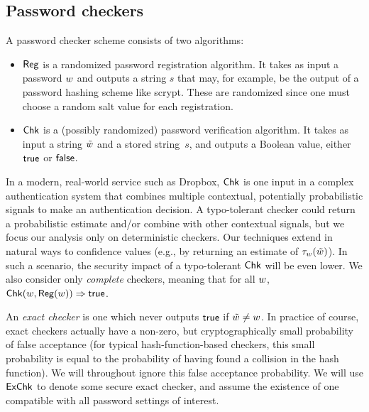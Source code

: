 \subsection{Password checkers}
A password checker scheme consists of two algorithms:

\begin{itemize}
\item $\textnormal{\textsf{Reg}}$ is a randomized password registration algorithm. 
It takes as input a password ${w}$ and outputs a string $s$ that 
may, for example, be the output of a password hashing scheme like scrypt. 
These are randomized since one must choose a random salt value 
for each registration.
%
\item $\textnormal{\textsf{Chk}}$ is a (possibly randomized) password verification
  algorithm.  It takes as input a string $\tilde{w}$ and a stored
  string~$s$, and outputs a Boolean value, either ${\sf true}$ or
  ${\sf false}$. 
\end{itemize}

In a modern, real-world service such as Dropbox, $\textnormal{\textsf{Chk}}$ is one
input in a complex authentication system that combines multiple contextual,
potentially probabilistic signals to make an authentication decision. A
typo-tolerant checker could return a probabilistic estimate and/or combine with
other contextual signals, but we focus our analysis only on deterministic checkers. 
Our techniques extend in natural ways to confidence values (e.g., by returning
an estimate of $\tau_{w}(\tilde{w})$). In such a scenario, the security
impact of a typo-tolerant $\textnormal{\textsf{Chk}}$ will be even lower. We also consider only {\em
complete} checkers, meaning that for all ${w}$, $\textnormal{\textsf{Chk}}({w}, \textnormal{\textsf{Reg}}({w}))
\Rightarrow {\sf true}$.

An \emph{exact checker} is one which never outputs ${\sf true}$ if
$\tilde{w} \ne {w}$. %
In practice of course, exact checkers actually have a non-zero, but
cryptographically small probability of false acceptance (for typical
hash-function-based checkers, this small probability is equal to the
probability of having found a collision in the hash function).  We
will throughout ignore this false acceptance probability.  We will use
$\textnormal{\textsf{ExChk}}$ to denote some secure exact checker, and assume the
existence of one compatible with all password settings of interest.


